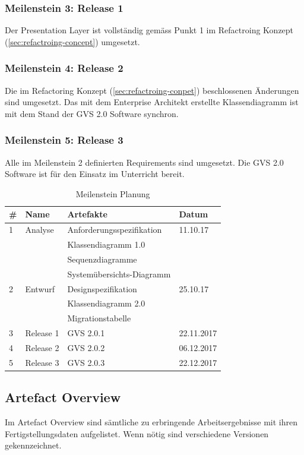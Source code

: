\documentclass[11pt,a4paper,english,oneside]{book}
\numberwithin{equation}{chapter}
\begin{document}
	\subsubsection{Meilenstein 3: Release 1}
	Der Presentation Layer ist vollständig gemäss Punkt 1 im Refactroing Konzept (\ref{sec:refactroing-concept}) umgesetzt.
	
	\subsubsection{Meilenstein 4: Release 2}
	Die im Refactoring Konzept (\ref{sec:refactroing-conpet}) beschlossenen Änderungen sind umgesetzt. Das mit dem Enterprise Architekt erstellte Klassendiagramm ist mit dem Stand der GVS 2.0 Software synchron.
	
	\subsubsection{Meilenstein 5: Release 3}
	Alle im Meilenstein 2 definierten Requirements sind umgesetzt. Die GVS 2.0 Software ist für den Einsatz im Unterricht bereit.
	
	\begin{table}[h!]
		\centering
		\begin{tabular}{l l l l}
			\toprule 
			\# & Name & Artefakte & Datum \\
			\toprule 
			1 & Analyse & Anforderungsspezifikation & 11.10.17 \\
			& & Klassendiagramm 1.0 & \\
			& & Sequenzdiagramme & \\
			& &  Systemübersichts-Diagramm & \\
			\midrule
			2 & Entwurf  & Designspezifikation & 25.10.17\\
			& & Klassendiagramm 2.0 & \\
			& & Migrationstabelle & \\
			\midrule
			3 & Release 1 & GVS 2.0.1 & 22.11.2017 \\
			\midrule
			4 & Release 2 & GVS 2.0.2 & 06.12.2017 \\
			\midrule
			5 & Release 3 & GVS 2.0.3 & 22.12.2017 \\
			\bottomrule 
		\end{tabular} 
		\caption{Meilenstein Planung} 
	\end{table}
	
	\subsection{Artefact Overview}
	Im Artefact Overview sind sämtliche zu erbringende Arbeitsergebnisse mit ihren Fertigstellungsdaten aufgelistet. Wenn nötig sind verschiedene Versionen gekennzeichnet.
	
	
\end{document}

